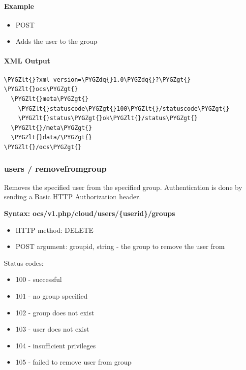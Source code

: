 \documentclass[letterpaper,10pt,english]{sphinxmanual}
\def\PYGZlt{\char`\<}
\def\PYGZgt{\char`\>}
\def\PYGZdq{\char`\"}
\begin{document}
\paragraph{Example}
\label{configuration_user/user_provisioning_api:id10}\begin{itemize}
\item {} 
POST 

\item {} 
Adds the user  to the group 

\end{itemize}


\paragraph{XML Output}
\label{configuration_user/user_provisioning_api:id11}
\begin{Verbatim}[commandchars=\\\{\}]
\PYGZlt{}?xml version=\PYGZdq{}1.0\PYGZdq{}?\PYGZgt{}
\PYGZlt{}ocs\PYGZgt{}
  \PYGZlt{}meta\PYGZgt{}
    \PYGZlt{}statuscode\PYGZgt{}100\PYGZlt{}/statuscode\PYGZgt{}
    \PYGZlt{}status\PYGZgt{}ok\PYGZlt{}/status\PYGZgt{}
  \PYGZlt{}/meta\PYGZgt{}
  \PYGZlt{}data/\PYGZgt{}
\PYGZlt{}/ocs\PYGZgt{}
\end{Verbatim}


\subsubsection{\textbf{users / removefromgroup}}
\label{configuration_user/user_provisioning_api:users-removefromgroup}
Removes the specified user from the specified group. Authentication is done by
sending a Basic HTTP Authorization header.

\textbf{Syntax: ocs/v1.php/cloud/users/\{userid\}/groups}
\begin{itemize}
\item {} 
HTTP method: DELETE

\item {} 
POST argument: groupid, string - the group to remove the user from

\end{itemize}

Status codes:
\begin{itemize}
\item {} 
100 - successful

\item {} 
101 - no group specified

\item {} 
102 - group does not exist

\item {} 
103 - user does not exist

\item {} 
104 - insufficient privileges

\item {} 
105 - failed to remove user from group

\end{itemize}
\end{document}
